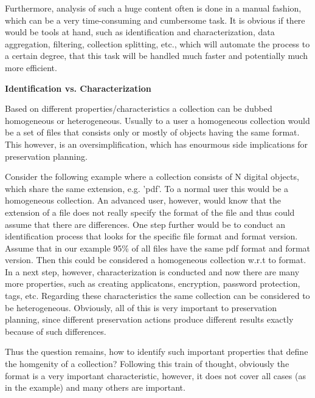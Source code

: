 Furthermore, analysis of such a huge content often is done in a manual fashion, which can be a very time-consuming and cumbersome task. It is obvious if there would be tools at hand, such as identification and characterization, data aggregation, filtering, collection splitting, etc., which will automate the process to a certain degree, that this task will be handled much faster and potentially much more efficient. \newline

\textbf{Identification vs. Characterization}

Based on different properties/characteristics a collection can be dubbed homogeneous or heterogeneous. Usually to a user a homogeneous collection would be a set of files that consists only or mostly of objects having the same format. This however, is an oversimplification, which has enourmous side implications for preservation planning.

Consider the following example where a collection consists of N digital objects, which share the same extension, e.g. 'pdf'. To a normal user this would be a homogeneous collection. An advanced user, however, would know that the extension of a file does not really specify the format of the file and thus could assume that there are differences.
One step further would be to conduct an identification process that looks for the specific file format and format version. Assume that in our example 95\% of all files have the same pdf format and format version.  Then this could be considered a homogeneous collection w.r.t to format. 
In a next step, however, characterization is conducted and now there are many more properties, such as creating applicatons, encryption, password protection, tags, etc.
Regarding these characteristics the same collection can be considered to be heterogeneous.
Obviously, all of this is very important to preservation planning, since different preservation actions produce different results exactly because of such differences.

Thus the question remains, how to identify such important properties that define the homgenity of a collection? Following this train of thought, obviously the format is a very important characteristic, however, it does not cover all cases (as in the example) and many others are important. \newline



